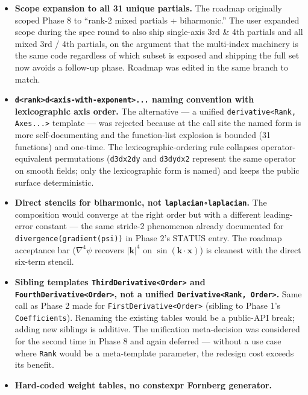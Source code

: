 \begin{itemize}
\item
  \textbf{Scope expansion to all 31 unique partials.} The roadmap
  originally scoped Phase 8 to ``rank-2 mixed partials + biharmonic.''
  The user expanded scope during the spec round to also ship single-axis
  3rd \& 4th partials and all mixed 3rd / 4th partials, on the argument
  that the multi-index machinery is the same code regardless of which
  subset is exposed and shipping the full set now avoids a follow-up
  phase. Roadmap was edited in the same branch to match.
\item
  \textbf{\passthrough{\lstinline!d<rank>d<axis-with-exponent>...!}
  naming convention with lexicographic axis order.} The alternative ---
  a unified \passthrough{\lstinline!derivative<Rank, Axes...>!} template
  --- was rejected because at the call site the named form is more
  self-documenting and the function-list explosion is bounded (31
  functions) and one-time. The lexicographic-ordering rule collapses
  operator-equivalent permutations (\passthrough{\lstinline!d3dx2dy!}
  and \passthrough{\lstinline!d3dydx2!} represent the same operator on
  smooth fields; only the lexicographic form is named) and keeps the
  public surface deterministic.
\item
  \textbf{Direct stencils for biharmonic, not
  \passthrough{\lstinline!laplacian∘laplacian!}.} The composition would
  converge at the right order but with a different leading-error
  constant --- the same stride-2 phenomenon already documented for
  \passthrough{\lstinline!divergence(gradient(psi))!} in Phase 2's
  STATUS entry. The roadmap acceptance bar (\(\nabla^4\psi\) recovers
  \(|\mathbf{k}|^4\) on \(\sin(\mathbf{k}\cdot\mathbf{x})\)) is cleanest
  with the direct six-term stencil.
\item
  \textbf{Sibling templates
  \passthrough{\lstinline!ThirdDerivative<Order>!} and
  \passthrough{\lstinline!FourthDerivative<Order>!}, not a unified
  \passthrough{\lstinline!Derivative<Rank, Order>!}.} Same call as Phase
  2 made for \passthrough{\lstinline!FirstDerivative<Order>!} (sibling
  to Phase 1's \passthrough{\lstinline!Coefficients!}). Renaming the
  existing tables would be a public-API break; adding new siblings is
  additive. The unification meta-decision was considered for the second
  time in Phase 8 and again deferred --- without a use case where
  \passthrough{\lstinline!Rank!} would be a meta-template parameter, the
  redesign cost exceeds its benefit.
\item
  \textbf{Hard-coded weight tables, no constexpr Fornberg generator.}

\end{itemize}
